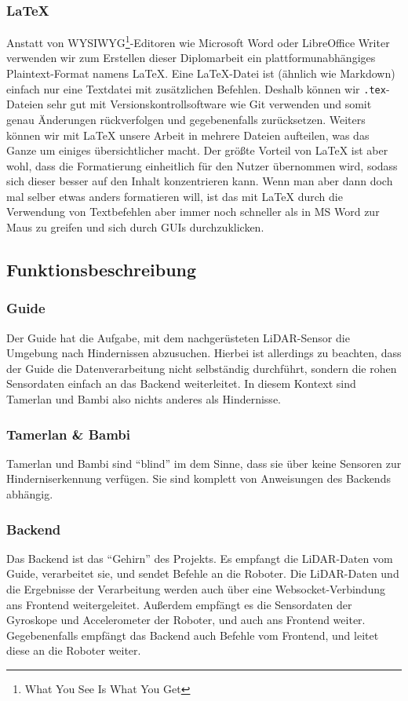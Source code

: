 \subsubsection{\LaTeX}
\label{subsec:latex}
Anstatt von WYSIWYG\footnote{What You See Is What You Get}-Editoren
wie Microsoft Word oder LibreOffice Writer verwenden wir zum Erstellen dieser Diplomarbeit
ein plattformunabhängiges Plaintext-Format namens \LaTeX.
Eine LaTeX-Datei ist (ähnlich wie Markdown) einfach nur eine Textdatei mit zusätzlichen Befehlen.
Deshalb können wir \texttt{.tex}-Dateien sehr gut mit Versionskontrollsoftware wie Git verwenden
und somit genau Änderungen rückverfolgen und gegebenenfalls zurücksetzen.
%
Weiters können wir mit LaTeX unsere Arbeit in mehrere Dateien aufteilen,
was das Ganze um einiges übersichtlicher macht.
%
Der größte Vorteil von LaTeX ist aber wohl,
dass die Formatierung einheitlich für den Nutzer übernommen wird,
sodass sich dieser besser auf den Inhalt konzentrieren kann.
%
Wenn man aber dann doch mal selber etwas anders formatieren will,
ist das mit LaTeX durch die Verwendung von Textbefehlen
aber immer noch schneller als in MS Word zur Maus zu greifen
und sich durch GUIs durchzuklicken.

\subsection{Funktionsbeschreibung}
\label{subsec:funktionsbeschreibung}

\subsubsection{Guide}
Der Guide hat die Aufgabe,
mit dem nachgerüsteten LiDAR-Sensor die Umgebung nach Hindernissen abzusuchen.
%
Hierbei ist allerdings zu beachten,
dass der Guide die Datenverarbeitung nicht selbständig durchführt,
sondern die rohen Sensordaten einfach an das Backend weiterleitet.
%
In diesem Kontext sind Tamerlan und Bambi also nichts anderes als Hindernisse.

\subsubsection{Tamerlan \& Bambi}
Tamerlan und Bambi sind ``blind'' im dem Sinne,
dass sie über keine Sensoren zur Hinderniserkennung verfügen.
%
Sie sind komplett von Anweisungen des Backends abhängig.

\subsubsection{Backend}
Das Backend ist das ``Gehirn'' des Projekts.
%
Es empfangt die LiDAR-Daten vom Guide,
verarbeitet sie,
und sendet Befehle an die Roboter.
%
Die LiDAR-Daten und die Ergebnisse der Verarbeitung werden auch
über eine Websocket-Verbindung ans Frontend weitergeleitet.
%
Außerdem empfängt es die Sensordaten der Gyroskope und Accelerometer der Roboter, und auch ans Frontend weiter. 
%
Gegebenenfalls empfängt das Backend auch Befehle vom Frontend, und leitet diese an die Roboter weiter.

